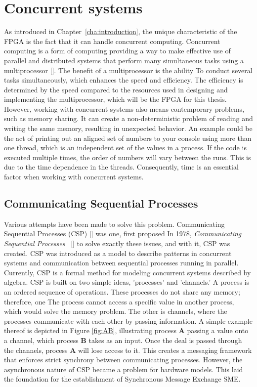 \section{Concurrent systems}
As introduced in Chapter~\ref{cha:introduction}, the unique characteristic of the \acrshort{FPGA} is the fact that it can handle concurrent computing.
Concurrent computing is a form of computing providing a way to make effective use of parallel and distributed systems that perform many simultaneous tasks using a multiprocessor [\cite{concurrent}]. The benefit of a multiprocessor is the ability %
To conduct several tasks simultaneously, which enhances the speed
and efficiency. The efficiency is
determined by the speed compared to the resources used
in designing and implementing the multiprocessor, which will be the FPGA for this thesis.
However, working with concurrent systems also means contemporary problems, such as memory sharing. It can create a non-deterministic problem of reading and writing the
same memory, resulting in unexpected behavior.
An example could be the act of printing out an aligned set of numbers to your console using more than one thread, which is an independent set of the values in a process.
If the code is executed multiple times, the order of numbers will vary between the
runs. This is due to the time dependence in the threads. Consequently, time is an essential factor when working with concurrent systems. 


\subsection{Communicating Sequential Processes}
Various attempts have been made to solve this problem. Communicating Sequential Processes (CSP) [\cite{CSP}] was one, first proposed In 1978, \textit{Communicating Sequential Processes}~ [\cite{hoare_communicating_1978}] to
solve exactly these issues, and with it, CSP was created.
CSP was introduced as a model to describe patterns in concurrent systems and communication between sequential processes running in parallel. Currently, CSP is a formal method for modeling concurrent systems described by algebra.
CSP is built on two simple ideas, 'processes' and 'channels.’ A process is an ordered sequence of operations. These processes do not share any memory; therefore, one
The process cannot access a specific value in another process, which would solve the memory problem.
The other is channels, where the processes communicate with each
other by passing information. A simple example thereof is depicted in Figure \ref{fig:AB}, illustrating process \textbf{A} passing a
value onto a channel, which process \textbf{B} takes as an input. Once the deal is passed through the channels,
process \textbf{A} will lose access to it. This creates a messaging framework that enforces strict synchrony between communicating processes. However, the asynchronous nature
of CSP became a problem for hardware models. 
This laid the foundation for the establishment of Synchronous Message Exchange \acrshort{SME}.\\


